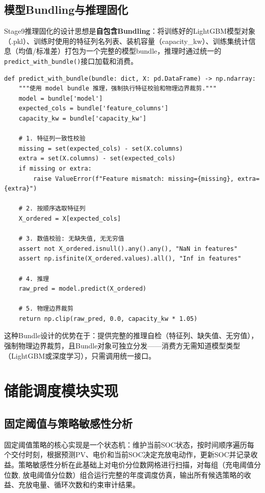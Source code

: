 \documentclass[12pt,a4paper]{ctexbook}
\begin{document}
\subsection{模型Bundling与推理固化}

Stage9推理固化的设计思想是\textbf{自包含Bundling}：将训练好的LightGBM模型对象（.pkl）、训练时使用的特征列名列表、装机容量（capacity\_kw）、训练集统计信息（均值/标准差）打包为一个完整的模型bundle，推理时通过统一的\texttt{predict\_with\_bundle()}接口加载和消费。

\begin{lstlisting}[caption={模型Bundle推理接口（精简自 stage9\_inference.py）}, label={lst:bundle}]
def predict_with_bundle(bundle: dict, X: pd.DataFrame) -> np.ndarray:
    """使用 model bundle 推理，强制执行特征校验和物理边界裁剪."""
    model = bundle['model']
    expected_cols = bundle['feature_columns']
    capacity_kw = bundle['capacity_kw']

    # 1. 特征列一致性校验
    missing = set(expected_cols) - set(X.columns)
    extra = set(X.columns) - set(expected_cols)
    if missing or extra:
        raise ValueError(f"Feature mismatch: missing={missing}, extra={extra}")

    # 2. 按顺序选取特征列
    X_ordered = X[expected_cols]

    # 3. 数值校验: 无缺失值, 无无穷值
    assert not X_ordered.isnull().any().any(), "NaN in features"
    assert np.isfinite(X_ordered.values).all(), "Inf in features"

    # 4. 推理
    raw_pred = model.predict(X_ordered)

    # 5. 物理边界裁剪
    return np.clip(raw_pred, 0.0, capacity_kw * 1.05)
\end{lstlisting}

这种Bundle设计的优势在于：提供完整的推理自检（特征列、缺失值、无穷值），强制物理边界裁剪，且Bundle对象可独立分发——消费方无需知道模型类型（LightGBM或深度学习），只需调用统一接口。

\section{储能调度模块实现}

\subsection{固定阈值与策略敏感性分析}

固定阈值策略的核心实现是一个状态机：维护当前SOC状态，按时间顺序遍历每个交付时刻，根据预测PV、电价和当前SOC决定充放电动作，更新SOC并记录收益。策略敏感性分析在此基础上对电价分位数网格进行扫描，对每组（充电阈值分位数, 放电阈值分位数）组合运行完整的年度调度仿真，输出所有候选策略的收益、充放电量、循环次数和约束审计结果。
\end{document}

